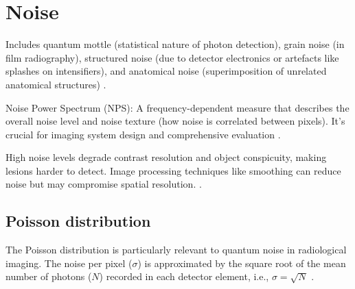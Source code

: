 \chapter{Noise}

Includes quantum mottle (statistical nature of photon detection),
grain noise (in film radiography), structured noise (due to detector
electronics or artefacts like splashes on intensifiers), and
anatomical noise (superimposition of unrelated anatomical structures)
\cite{bushberg2011essential}.


Noise Power Spectrum (NPS): A frequency-dependent measure that
describes the overall noise level and noise texture (how noise is
correlated between pixels). It's crucial for imaging system design and
comprehensive evaluation \cite{bushberg2011essential}.

High noise levels degrade contrast resolution and object conspicuity,
making lesions harder to detect. Image processing techniques like
smoothing can reduce noise but may compromise spatial
resolution. \cite{bushberg2011essential}.

\section{Poisson distribution}
The Poisson distribution is
particularly relevant to quantum noise in radiological imaging. The
noise per pixel ($\sigma$) is approximated by the square root of the
mean number of photons ($N$) recorded in each detector element, i.e.,
$\sigma = \sqrt{N}$ \cite{bushberg2011essential}.
